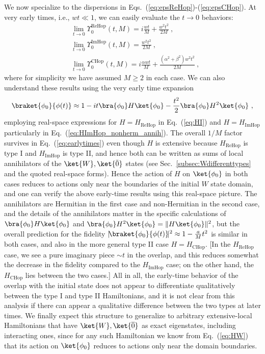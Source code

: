 \documentclass[prx,letterpaper,aps,superscriptaddress,floatfix,twocolumn,nofootinbib]{revtex4-2}
\theoremstyle{definition}
\newcommand{\ktO}{\ket{\overline{0}}}
\newcommand{\ktW}{\ket{W}}
\begin{document}
%
We now specialize to the dispersions in Eqs.~(\ref{eq:epsReHop})-(\ref{eq:epsCHop}).
%
At very early times, i.e., $wt \ll 1$, we can easily evaluate the $t \to 0$ behaviors:
\begin{align}
& \lim_{t \to 0} \Upsilon_0^{\text{ReHop}}(t,M) = i\frac{w t}{M} + \frac{w^2 t^2}{2M} ~, \\
& \lim_{t \to 0} \Upsilon_0^{\text{ImHop}}(t,M) = \frac{w^2 t^2}{2M} ~, \\
& \lim_{t \to 0} \Upsilon_0^{\text{CHop}}(t,M) = i\frac{\alpha w t}{M} +\frac{(\alpha^2 + \beta^2) w^2 t^2}{2M}
~\label{eq:earlytimes},
\end{align}
where for simplicity we have assumed $M \geq 2$ in each case.
%
We can also understand these results using the very early time expansion 
\begin{equation}
\braket{\phi_0}{\phi(t)} \approx 1 - i t \bra{\phi_0} H \ket{\phi_0} - \frac{t^2}{2} \bra{\phi_0} H^2 \ket{\phi_0} ~,
\end{equation}
employing real-space expressions for $H = H_{\text{ReHop}}$ in Eq.~(\ref{eq:HI}) and $H = H_{\text{ImHop}}$ particularly in Eq.~(\ref{eq:HImHop_nonherm_annih}).
%
The overall $1/M$ factor survives in Eq.~(\ref{eq:earlytimes}) even though $H$ is extensive because $H_{\text{ReHop}}$ is type I and $H_{\text{ImHop}}$ is type II, and hence both can be written as sums of local annihilators of the $\ket{W}, \ket{\bar{0}}$ states (see Sec.~\ref{subsec:Wdifferenttypes} and the quoted real-space forms).
%
Hence the action  of $H$ on $\ket{\phi_0}$ in both cases reduces to actions only near the boundaries of the initial $W$ state domain, and one can verify the above early-time results using this real-space picture.
%
The annihilators are Hermitian in the first case and non-Hermitian in the second case, and the details of the annihilators matter in the specific calculations of $\bra{\phi_0} H \ket{\phi_0}$ and $\bra{\phi_0} H^2 \ket{\phi_0} = \|H \ket{\phi_0}\|^2$, but the overall prediction for the fidelity $|\!\braket{\phi_0}{\phi(t)} \!|^2 \approx 1 - \frac{a}{M} t^2$ is similar in both cases, and also in the more general type II case $H = H_{\text{CHop}}$.
%
[In the $H_{\text{ReHop}}$ case, we see a pure imaginary piece $\sim t$ in the overlap, and this reduces somewhat the decrease in the fidelity compared to the $H_{\text{ImHop}}$ case; on the other hand, the $H_{\text{CHop}}$ lies between the two cases.]
%
All in all, the early-time behavior of the overlap with the initial state does not appear to differentiate qualitatively between the type I and type II Hamiltonians, and it is not clear from this analysis if there can appear a qualitative difference between the two types at later times.
%
We finally expect this structure to generalize to arbitrary extensive-local Hamiltonians that have $\ktW, \ktO$ as exact eigenstates, including interacting ones, since for any such Hamiltonian we know from Eq.~(\ref{eq:HW}) that its action on $\ket{\phi_0}$ reduces to actions only near the domain boundaries.
%
\end{document}

